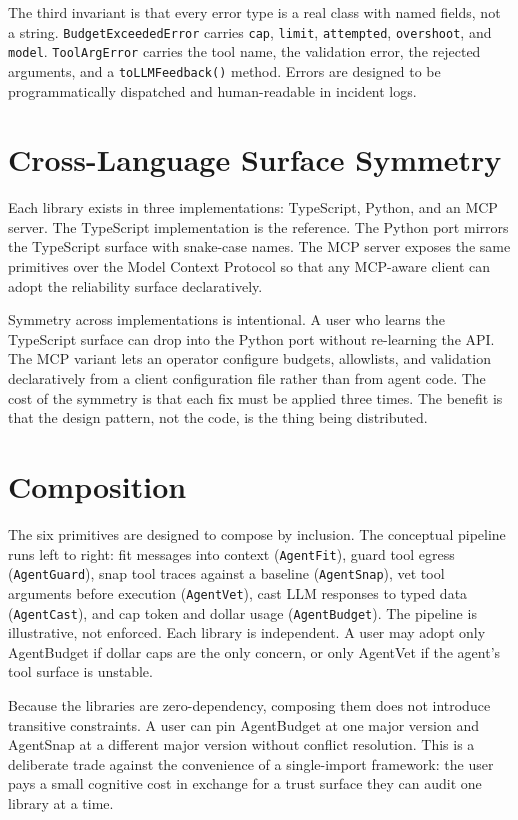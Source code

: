 \documentclass[11pt]{article}
\begin{document}
The third invariant is that every error type is a real class with named fields, not a string. \texttt{BudgetExceededError} carries \texttt{cap}, \texttt{limit}, \texttt{attempted}, \texttt{overshoot}, and \texttt{model}. \texttt{ToolArgError} carries the tool name, the validation error, the rejected arguments, and a \texttt{toLLMFeedback()} method. Errors are designed to be programmatically dispatched and human-readable in incident logs.

\section{Cross-Language Surface Symmetry}


Each library exists in three implementations: TypeScript, Python, and an MCP server. The TypeScript implementation is the reference. The Python port mirrors the TypeScript surface with snake-case names. The MCP server exposes the same primitives over the Model Context Protocol so that any MCP-aware client can adopt the reliability surface declaratively.

Symmetry across implementations is intentional. A user who learns the TypeScript surface can drop into the Python port without re-learning the API. The MCP variant lets an operator configure budgets, allowlists, and validation declaratively from a client configuration file rather than from agent code. The cost of the symmetry is that each fix must be applied three times. The benefit is that the design pattern, not the code, is the thing being distributed.

\section{Composition}


The six primitives are designed to compose by inclusion. The conceptual pipeline runs left to right: fit messages into context (\texttt{AgentFit}), guard tool egress (\texttt{AgentGuard}), snap tool traces against a baseline (\texttt{AgentSnap}), vet tool arguments before execution (\texttt{AgentVet}), cast LLM responses to typed data (\texttt{AgentCast}), and cap token and dollar usage (\texttt{AgentBudget}). The pipeline is illustrative, not enforced. Each library is independent. A user may adopt only AgentBudget if dollar caps are the only concern, or only AgentVet if the agent's tool surface is unstable.

Because the libraries are zero-dependency, composing them does not introduce transitive constraints. A user can pin AgentBudget at one major version and AgentSnap at a different major version without conflict resolution. This is a deliberate trade against the convenience of a single-import framework: the user pays a small cognitive cost in exchange for a trust surface they can audit one library at a time.
\end{document}
